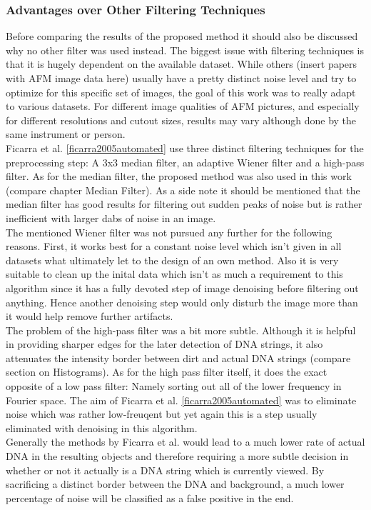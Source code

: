 \documentclass{article}
\begin{document}
\subsubsection{Advantages over Other Filtering Techniques}
Before comparing the results of the proposed method it should also be discussed why no other filter was used instead.
The biggest issue with filtering techniques is that it is hugely dependent on the available dataset. While others (insert papers with AFM image data here) usually have a pretty distinct noise level and try to optimize for this specific set of images, the goal of this work was to really adapt to various datasets. For different image qualities of AFM pictures, and especially for different resolutions and cutout sizes, results may vary although done by the same instrument or person. \\
Ficarra et al. \ref{ficarra2005automated} use three distinct filtering techniques for the preprocessing step: A 3x3 median filter, an adaptive Wiener filter and a high-pass filter. As for the median filter, the proposed method was also used in this work (compare chapter Median Filter). As a side note it should be mentioned that the median filter has good results for filtering out sudden peaks of noise but is rather inefficient with larger dabs of noise in an image. \\
The mentioned Wiener filter was not pursued any further for the following reasons. First, it works best for a constant noise level which isn't given in all datasets what ultimately let to the design of an own method. Also it is very suitable to clean up the inital data which isn't as much a requirement to this algorithm since it has a fully devoted step of image denoising before filtering out anything. Hence another denoising step would only disturb the image more than it would help remove further artifacts. \\
The problem of the high-pass filter was a bit more subtle. Although it is helpful in providing sharper edges for the later detection of DNA strings, it also attenuates the intensity border between dirt and actual DNA strings (compare section on Histograms). As for the high pass filter itself, it does the exact opposite of a low pass filter: Namely sorting out all of the lower frequency in Fourier space. The aim of Ficarra et al. \ref{ficarra2005automated} was to eliminate noise which was rather low-freuqent but yet again this is a step usually eliminated with denoising in this algorithm. \\
Generally the methods by Ficarra et al. would lead to a much lower rate of actual DNA in the resulting objects and therefore requiring a more subtle decision in whether or not it actually is a DNA string which is currently viewed. By sacrificing a distinct border between the DNA and background, a much lower percentage of noise will be classified as a false positive in the end.
\end{document}
